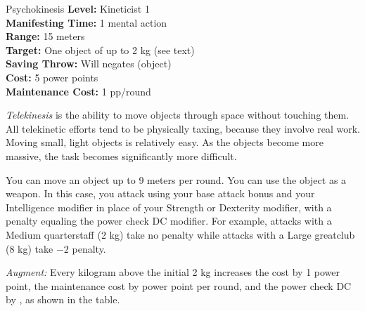 {Psychokinesis}
{
	\textbf{Level:}
	Kineticist 1\\
	\textbf{Manifesting Time:}
	1 mental action\\
	\textbf{Range:}
	15 meters\\
	\textbf{Target:}
	One object of up to 2 kg (see text)\\
	\textbf{Saving Throw:}
	Will negates (object)\\
	\textbf{Cost:}
	5 power points\\
	\textbf{Maintenance Cost:}
	1 pp/round\\
}
{
	\emph{Telekinesis} is the ability to move objects through space without touching them.  All telekinetic efforts tend to be physically taxing, because they involve real work. Moving small, light objects is relatively easy. As the objects become more massive, the task becomes significantly more difficult.

	You can move an object up to 9 meters per round. You can use the object as a weapon. In this case, you attack using your base attack bonus and your Intelligence modifier in place of your Strength or Dexterity modifier, with a penalty equaling the power check DC modifier. For example, attacks with a Medium quarterstaff (2 kg) take no penalty while attacks with a Large greatclub (8 kg) take $-2$ penalty.

	\textit{Augment:} Every kilogram above the initial 2 kg increases the cost by 1 power point, the maintenance cost by \onehalf power point per round, and the power check DC by \onethird, as shown in the table. 

}